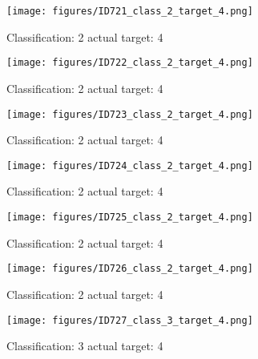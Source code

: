 \begin{figure}[h!]
\begin{center}
\texttt{[image: figures/ID721\_class\_2\_target\_4.png]}
\end{center}
\caption{ Classification: 2 actual target: 4}
\label{fig:ID721_class_2_target_4}
\end{figure}
\begin{figure}[h!]
\begin{center}
\texttt{[image: figures/ID722\_class\_2\_target\_4.png]}
\end{center}
\caption{ Classification: 2 actual target: 4}
\label{fig:ID722_class_2_target_4}
\end{figure}
\begin{figure}[h!]
\begin{center}
\texttt{[image: figures/ID723\_class\_2\_target\_4.png]}
\end{center}
\caption{ Classification: 2 actual target: 4}
\label{fig:ID723_class_2_target_4}
\end{figure}
\begin{figure}[h!]
\begin{center}
\texttt{[image: figures/ID724\_class\_2\_target\_4.png]}
\end{center}
\caption{ Classification: 2 actual target: 4}
\label{fig:ID724_class_2_target_4}
\end{figure}
\begin{figure}[h!]
\begin{center}
\texttt{[image: figures/ID725\_class\_2\_target\_4.png]}
\end{center}
\caption{ Classification: 2 actual target: 4}
\label{fig:ID725_class_2_target_4}
\end{figure}
\begin{figure}[h!]
\begin{center}
\texttt{[image: figures/ID726\_class\_2\_target\_4.png]}
\end{center}
\caption{ Classification: 2 actual target: 4}
\label{fig:ID726_class_2_target_4}
\end{figure}
\begin{figure}[h!]
\begin{center}
\texttt{[image: figures/ID727\_class\_3\_target\_4.png]}
\end{center}
\caption{ Classification: 3 actual target: 4}
\label{fig:ID727_class_3_target_4}
\end{figure}

